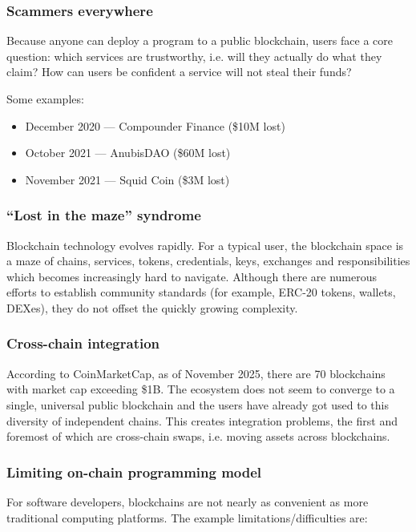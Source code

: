\documentclass[a4paper]{article}
\begin{document}
\subsubsection{Scammers everywhere}

Because anyone can deploy a program to a public blockchain, users face a core question: which services are trustworthy, i.e. will they actually do what they claim? How can users be confident a service will not steal their funds?

Some examples:

\begin{itemize}
  \item December 2020 --- Compounder Finance (\$10M lost)
  \item October 2021 --- AnubisDAO (\$60M lost)
  \item November 2021 --- Squid Coin (\$3M lost)
\end{itemize}

\subsubsection{``Lost in the maze'' syndrome}

Blockchain technology evolves rapidly. For a typical user, the blockchain space is a maze of chains, services, tokens, credentials, keys, exchanges and responsibilities which becomes increasingly hard to navigate. Although there are numerous efforts to establish community standards (for example, ERC-20 tokens, wallets, DEXes), they do not offset the quickly growing complexity.

\subsubsection{Cross-chain integration}

According to CoinMarketCap, as of November 2025, there are 70 blockchains with market cap exceeding \$1B. The ecosystem does not seem to converge to a single, universal public blockchain and the users have already got used to this diversity of independent chains. This creates integration problems, the first and foremost of which are cross-chain swaps, i.e. moving assets across blockchains.

\subsubsection{Limiting on-chain programming model}

For software developers, blockchains are not nearly as convenient as more traditional computing platforms. The example limitations/difficulties are:
\end{document}
